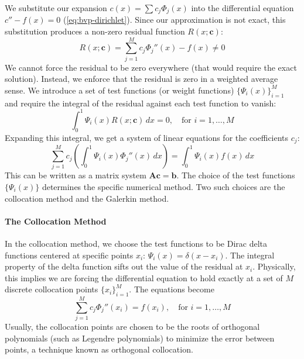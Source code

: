 We substitute our expansion $c(x) = \sum c_j \Phi_j(x)$ into the differential equation $c'' - f(x) = 0$ (\autoref{eq:bvp-dirichlet}). Since our approximation is not exact, this substitution produces a non-zero residual function $R(x; \mathbf{c})$:
\begin{equation}
    R(x; \mathbf{c}) = \sum_{j=1}^M c_j \Phi_j''(x) - f(x) \neq 0
\end{equation}
We cannot force the residual to be zero everywhere (that would require the exact solution). Instead, we enforce that the residual is zero in a weighted average sense. We introduce a set of test functions (or weight functions) $\{\Psi_i(x)\}_{i=1}^M$ and require the integral of the residual against each test function to vanish:
\begin{equation}
    \int_0^1 \Psi_i(x) R(x; \mathbf{c}) \, dx = 0, \quad \text{for } i = 1, \dots, M
\end{equation}
Expanding this integral, we get a system of linear equations for the coefficients $c_j$:
\begin{equation}
    \sum_{j=1}^M c_j \left( \int_0^1 \Psi_i(x) \Phi_j''(x) \, dx \right) = \int_0^1 \Psi_i(x) f(x) \, dx
\end{equation}
This can be written as a matrix system $\mathbf{A}\mathbf{c} = \mathbf{b}$. The choice of the test functions $\{\Psi_i(x)\}$ determines the specific numerical method. Two such choices are the collocation method and the Galerkin method.

\paragraph*{The Collocation Method}

In the collocation method, we choose the test functions to be Dirac delta functions centered at specific points $x_i$: $\Psi_i(x) = \delta(x - x_i)$. The integral property of the delta function sifts out the value of the residual at $x_i$. Physically, this implies we are forcing the differential equation to hold exactly at a set of $M$ discrete collocation points $\{x_i\}_{i=1}^M$. The equations become
\begin{equation}
    \sum_{j=1}^M c_j \Phi_j''(x_i) = f(x_i), \quad \text{for } i = 1, \dots, M
\end{equation}
Usually, the collocation points are chosen to be the roots of orthogonal polynomials (such as Legendre polynomials) to minimize the error between points, a technique known as orthogonal collocation.

